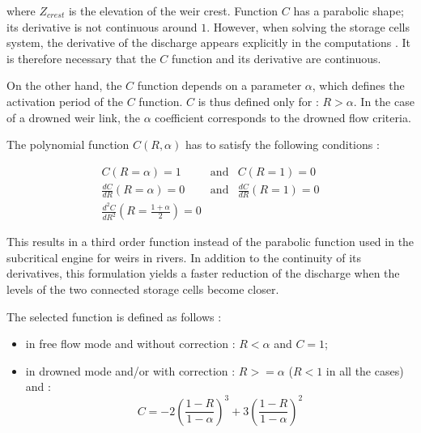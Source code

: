 \vspace{0.5cm}

where $Z_{crest}$ is the elevation of the weir crest. Function $C$ has a parabolic shape; its derivative is not continuous around $1$. However, when solving the storage cells system, the derivative of the discharge appears explicitly in the computations \cite{GOUTAL_RISSOAN02}. It is therefore necessary that the $C$ function and its derivative are continuous.

\vspace{0.5cm}

On the other hand, the $C$ function depends on a parameter $\alpha$, which defines the activation period of the $C$ function. $C$ is thus defined only for : $R > \alpha$. In the case of a drowned weir link, the $\alpha$ coefficient corresponds to the drowned flow criteria.

The polynomial function $C(R,\alpha)$ has to satisfy the following conditions :

\begin{eqnarray}
  C(R=\alpha)=1 & \mbox{and} & C(R=1)=0 \nonumber \\
  \frac{dC}{dR}(R=\alpha)=0 & \mbox{and} & \frac{dC}{dR}(R=1)=0 \nonumber \\
  \frac{d^2 C}{dR^2}(R=\frac{1+\alpha}{2})=0
\end{eqnarray}

This results in a third order function instead of the parabolic function used in the subcritical engine for weirs in rivers. In addition to the continuity of its derivatives, this formulation yields a faster reduction of the discharge when the levels of the two connected storage cells become closer.

\vspace{0.5cm}

The selected function is defined as follows :
\begin{itemize}
 \item in free flow mode and without correction : $R<\alpha$ and $C=1$;
 \item in drowned mode and/or with correction : $R>=\alpha$ ($R<1$ in all the cases) and :
   \begin{equation}
     C = -2 \left ( \frac{1-R}{1-\alpha} \right )^3 + 3 \left ( \frac{1-R}{1-\alpha} \right )^2
   \end{equation}
\end{itemize}

\vspace{0.5cm}

